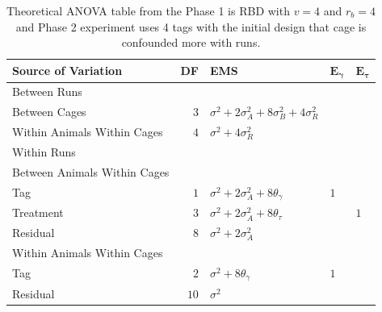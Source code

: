 \documentclass[12pt,a4paper]{article}
\begin{document}
\begin{table}[ht]
\centering
 \caption{Theoretical ANOVA table from the Phase 1 is RBD with $v = 4$ and $r_b = 4$ and Phase 2 experiment uses 4 tags with the initial design that cage is confounded more with runs.}
 \begin{tabular}[t]{lrlll} 
 \toprule 
 \multicolumn{1}{l}{\textbf{Source of Variation}} & \multicolumn{1}{l}{\textbf{DF}} & \multicolumn{1}{l}{\textbf{EMS}}& \multicolumn{1}{l}{$\bm{E_{\gamma}}$}&\multicolumn{1}{l}{$\bm{E_{\tau}}$}\\ 
 \midrule 
 Between Runs &  &  & & \\ 
 \quad Between Cages & $3$ & $\sigma^2+2\sigma_{A}^2+8\sigma_{B}^2+4\sigma_{R}^2$ & & \\  
 \quad Within Animals Within Cages & $4$ & $\sigma^2+4\sigma_{R}^2$ & & \\ \hline 
 Within Runs &  &  & & \\ 
 \quad Between Animals Within Cages &  &  & & \\ 
 \quad \quad Tag & $1$ & $\sigma^2+2\sigma_{A}^2+8\theta_{\gamma}$ &$1$ & \\ 
 \quad \quad Treatment & $3$ & $\sigma^2+2\sigma_{A}^2+8\theta_{\tau}$ & & $1$\\ 
 \quad \quad Residual & $8$ & $\sigma^2+2\sigma_{A}^2$ & & \\ \hline 
 \quad Within Animals Within Cages &  &  & & \\ 
 \quad \quad Tag & $2$ & $\sigma^2+8\theta_{\gamma}$ &$1$ & \\ 
 \quad \quad Residual & $10$ & $\sigma^2$ & & \\ 
 \bottomrule 
 \end{tabular} 
 \label{tab:ANOVAPhase1RBD1} 
\end{table} 
\end{document}
